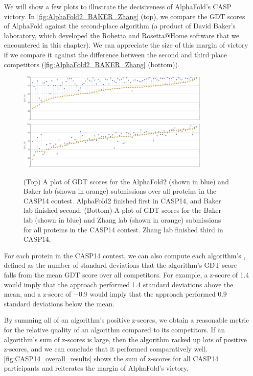 We will show a few plots to illustrate the decisiveness of AlphaFold's CASP victory. In \autoref{fig:AlphaFold2_BAKER_Zhang} (top), we compare the GDT scores of AlphaFold against the second-place algorithm (a product of David Baker's laboratory, which developed the Robetta and Rosetta@Home software that we encountered in this chapter). We can appreciate the size of this margin of victory if we compare it against the difference between the second and third place competitors (\autoref{fig:AlphaFold2_BAKER_Zhang} (bottom)).

\begin{figure}[h]
	\centering
	\mySfFamily
	\includegraphics[width = 0.85\textwidth]{../images/AlphaFold2_BAKER.png}\\[4ex]
	\includegraphics[width = 0.85\textwidth]{../images/BAKER_Zhang.png}
	\caption{(Top) A plot of GDT scores for the AlphaFold2 (shown in blue) and Baker lab (shown in orange) submissions over all proteins in the CASP14 contest. AlphaFold2 finished first in CASP14, and Baker lab finished second. (Bottom) A plot of GDT scores for the Baker lab (shown in blue) and Zhang lab (shown in orange) submissions for all proteins in the CASP14 contest. Zhang lab finished third in CASP14.}
	\label{fig:AlphaFold2_BAKER_Zhang}
\end{figure}

For each protein in the CASP14 contest, we can also compute each algorithm's , defined as the number of standard deviations that the algorithm's GDT score falls from the mean GDT score over all competitors. For example, a z-score of 1.4 would imply that the approach performed 1.4 standard deviations above the mean, and a z-score of $-0.9$ would imply that the approach performed 0.9 standard deviations below the mean.

By summing all of an algorithm's positive z-scores, we obtain a reasonable metric for the relative quality of an algorithm compared to its competitors. If an algorithm's sum of z-scores is large, then the algorithm racked up lots of positive z-scores, and we can conclude that it performed comparatively well. \autoref{fig:CASP14_overall_results} shows the sum of z-scores for all CASP14 participants and reiterates the margin of AlphaFold's victory.

